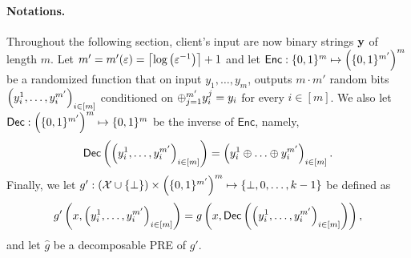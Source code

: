 \documentclass{llncs}
\newcommand{\X}{\mathcal{X}}
\newcommand{\y}{\myvec{y}}
\newcommand{\IKOPS}{\operatorname{IKOPS}}
\renewcommand{\Enc}{\mathsf{Enc}}
\renewcommand{\Dec}{\mathsf{Dec}}
\begin{document}
\paragraph{Notations.}
Throughout the following section, client's input are now binary strings $\y$ of length $m$. Let $m'=m'(\varepsilon)=\left\lceil \log\left ( \varepsilon^{-1} \right ) \right\rceil+1$ and let $\Enc:\zo^{m}\mapsto\left(\zo^{m'}\right)^{m}$ be a randomized function that on input $y_1,\ldots,y_m$, outputs $m\cdot m'$ random bits $\left ( y_i^1,\ldots,y_i^{m'} \right )_{i\in[m]}$ conditioned on $\oplus_{j=1}^{m'}y_i^j=y_i$ for every $i\in[m]$. We also let $\Dec:\left(\zo^{m'}\right)^{m}\mapsto\zo^{m}$ be the inverse of $\Enc$, namely, $$\Dec\of{\vect{y_i^1,\ldots,y_i^{m'}}_{i\in[m]}}=\vect{y_i^1\xor\ldots\xor y_i^{m'}}_{i\in[m]}.$$
Finally, we let $g':(\X\cup\set{\bot})\times\left(\zo^{m'}\right)^{m}\mapsto\set{\bot,0,\ldots,k-1}$ be defined as
$$g'\of{x,\vect{y_i^1,\ldots,y_i^{m'}}_{i\in[m]}}=g\left(x,\Dec\of{\vect{y_i^1,\ldots,y_i^{m'}}_{i\in[m]}}\right),
$$
and let $\hat{g}$ be a decomposable PRE of $g'$.
\end{document}
